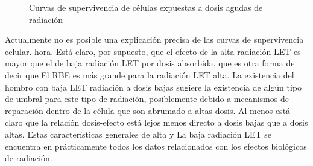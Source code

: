 \documentclass[]{article}
\begin{document}
\begin{figure}[h!]
	\centering
	\caption{Curvas de supervivencia de células expuestas a dosis agudas de radiación}
	\label{radiacionLET}
\end{figure}

Actualmente no es posible una explicación precisa de las curvas de supervivencia celular. hora. Está claro, por supuesto, que el efecto de la alta radiación LET es mayor que el de baja radiación LET por dosis absorbida, que es otra forma de decir que El RBE es más grande para la radiación LET alta. La existencia del hombro con baja LET radiación a dosis bajas sugiere la existencia de algún tipo de umbral para este tipo de radiación, posiblemente debido a mecanismos de reparación dentro de la célula que son abrumado a altas dosis. Al menos está claro que la relación dosis-efecto está lejos menos directo a dosis bajas que a dosis altas. Estas características generales de alta y La baja radiación LET se encuentra en prácticamente todos los datos relacionados con los efectos biológicos de radiación.\\
\end{document}
